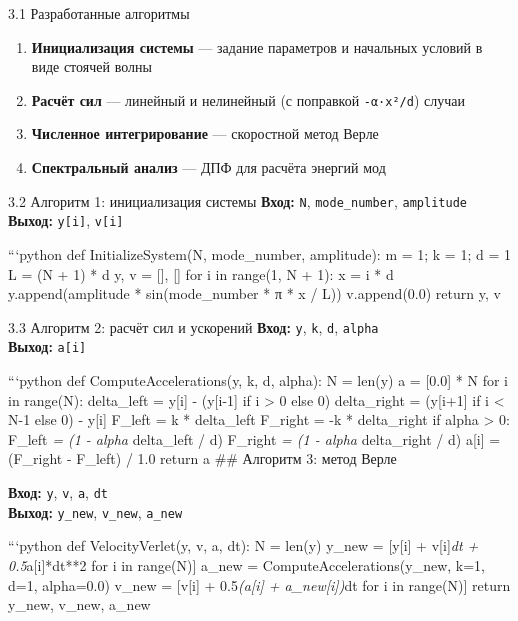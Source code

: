 \documentclass[
  ignorenonframetext,
  aspectratio=169,
  russian,
]{beamer}
\providecommand{\tightlist}{%
  \setlength{\itemsep}{0pt}\setlength{\parskip}{0pt}}\usepackage{longtable,booktabs,array}
\begin{document}
\begin{frame}[fragile]{3.1 Разработанные алгоритмы}
\label{ux440ux430ux437ux440ux430ux431ux43eux442ux430ux43dux43dux44bux435-ux430ux43bux433ux43eux440ux438ux442ux43cux44b}
\begin{enumerate}[<+->]
\tightlist
\item
  \textbf{Инициализация системы} --- задание параметров и начальных
  условий в виде стоячей волны
\item
  \textbf{Расчёт сил} --- линейный и нелинейный (с поправкой
  \texttt{-α·x²/d}) случаи
\item
  \textbf{Численное интегрирование} --- скоростной метод Верле
\item
  \textbf{Спектральный анализ} --- ДПФ для расчёта энергий мод
\end{enumerate}
\end{frame}

\begin{frame}[fragile]{3.2 Алгоритм 1: инициализация системы}
\label{ux430ux43bux433ux43eux440ux438ux442ux43c-1-ux438ux43dux438ux446ux438ux430ux43bux438ux437ux430ux446ux438ux44f-ux441ux438ux441ux442ux435ux43cux44b}
\textbf{Вход:} \texttt{N}, \texttt{mode\_number}, \texttt{amplitude}
\textbf{Выход:} \texttt{y{[}i{]}}, \texttt{v{[}i{]}}

```python def InitializeSystem(N, mode\_number, amplitude): m = 1; k =
1; d = 1 L = (N + 1) * d y, v = {[}{]}, {[}{]} for i in range(1, N + 1):
x = i * d y.append(amplitude * sin(mode\_number * π * x / L))
v.append(0.0) return y, v
\end{frame}

\begin{frame}[fragile]{3.3 Алгоритм 2: расчёт сил и ускорений}
\label{ux430ux43bux433ux43eux440ux438ux442ux43c-2-ux440ux430ux441ux447ux451ux442-ux441ux438ux43b-ux438-ux443ux441ux43aux43eux440ux435ux43dux438ux439}
\textbf{Вход:} \texttt{y}, \texttt{k}, \texttt{d}, \texttt{alpha}\\
\textbf{Выход:} \texttt{a{[}i{]}}

```python def ComputeAccelerations(y, k, d, alpha): N = len(y) a =
{[}0.0{]} * N for i in range(N): delta\_left = y{[}i{]} - (y{[}i-1{]} if
i \textgreater{} 0 else 0) delta\_right = (y{[}i+1{]} if i \textless{}
N-1 else 0) - y{[}i{]} F\_left = k * delta\_left F\_right = -k *
delta\_right if alpha \textgreater{} 0: F\_left \emph{= (1 - alpha }
delta\_left / d) F\_right \emph{= (1 - alpha } delta\_right / d)
a{[}i{]} = (F\_right - F\_left) / 1.0 return a \#\# Алгоритм 3: метод
Верле

\textbf{Вход:} \texttt{y}, \texttt{v}, \texttt{a}, \texttt{dt}\\
\textbf{Выход:} \texttt{y\_new}, \texttt{v\_new}, \texttt{a\_new}

```python def VelocityVerlet(y, v, a, dt): N = len(y) y\_new =
{[}y{[}i{]} + v{[}i{]}\emph{dt + 0.5}a{[}i{]}*dt**2 for i in range(N){]}
a\_new = ComputeAccelerations(y\_new, k=1, d=1, alpha=0.0) v\_new =
{[}v{[}i{]} + 0.5\emph{(a{[}i{]} + a\_new{[}i{]})}dt for i in
range(N){]} return y\_new, v\_new, a\_new
\end{frame}
\end{document}
